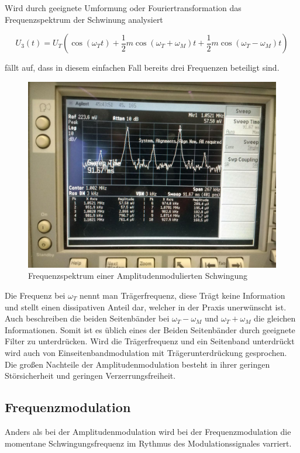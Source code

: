 Wird durch geeignete Umformung oder Fouriertransformation das Frequenzspektrum der Schwinung analysiert

\begin{equation}
U_{3}(t) = U_T ( \cos(\omega_T t) + \frac{1}{2}m\cos(\omega_T + \omega_M)t + \frac{1}{2}m\cos(\omega_T - \omega_M)t)
\end{equation}

fällt auf, dass in diesem einfachen Fall bereits drei Frequenzen beteiligt sind.

\begin{figure}
	\centering
	\includegraphics[width=\textwidth]{img/Aufgabenteil_b.jpg}
	\caption{Frequenzspektrum einer Amplitudenmodulierten Schwingung}
\end{figure}

Die Frequenz bei $\omega_T$ nennt man Trägerfrequenz, diese Trägt keine Information und stellt einen dissipativen Anteil dar, welcher in der Praxis unerwünscht ist. Auch beschreiben die beiden Seitenbänder bei $\omega_T - \omega_M$ und $\omega_T + \omega_M$ die gleichen Informationen. Somit ist es üblich eines der Beiden Seitenbänder durch geeignete Filter zu unterdrücken.
Wird die Trägerfrequenz und ein Seitenband unterdrückt wird auch von Einseitenbandmodulation mit Trägerunterdrückung gesprochen.
Die großen Nachteile der Amplitudenmodulation besteht in ihrer geringen Störsicherheit und geringen Verzerrungsfreiheit.

\subsection{Frequenzmodulation}
Anders als bei der Amplitudenmodulation wird bei der Frequenzmodulation die momentane Schwingungsfrequenz im Rythmus des Modulationssignales varriert.

